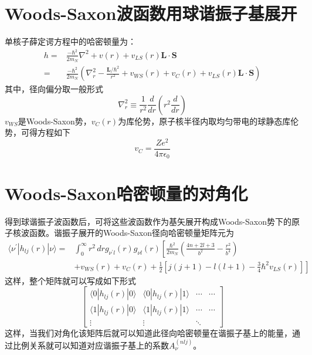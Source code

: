 \section{Woods-Saxon波函数用球谐振子基展开}
单核子薛定谔方程中的哈密顿量为：
\begin{equation}
	\begin{aligned}
		h =& \frac{-\hbar^2}{2 m_{N}} \nabla^2 + v(r) + v_{LS}(r) \boldsymbol{L\cdot S}	\\
		=& \frac{-\hbar^2}{2 m_{N}}\left(\nabla^2_{r} - \frac{\boldsymbol{L}/\hbar^2}{r^2} + v_{WS}(r) + v_{C}(r) + v_{LS}(r)\boldsymbol{L\cdot S}\right)
	\end{aligned}
\end{equation} 
其中，径向偏分取一般形式
\begin{equation}
	\nabla^2_{r} \equiv \frac{1}{r^2} \frac{d}{dr} \left(r^2 \frac{d}{dr}\right)
\end{equation}
$v_{WS}$是Woods-Saxon势，$v_{C}(r)$为库伦势，原子核半径内取均匀带电的球静态库伦势，可得方程如下
\begin{equation}
	v_{C} = \frac{Ze^2}{4\pi\epsilon_0}
\end{equation} 

\section{Woods-Saxon哈密顿量的对角化}
得到球谐振子波函数后，可将这些波函数作为基矢展开构成Woods-Saxon势下的原子核波函数。谐振子展开的Woods-Saxon径向哈密顿量矩阵元为
\begin{equation}
    \begin{aligned}
		\langle \nu^{\prime} | h_{lj}(r) | \nu\rangle =&\int_{0}^{\infty} r^2 \,dr g_{\nu^{\prime} l}(r) g_{\nu l}(r) \left[ \frac{\hbar^2}{2m_N} \left(\frac{4n + 2l + 3}{b^2} - \frac{r^2}{b^4}\right) \right. \\
		&+ \left. v_{WS}(r) + v_{C}(r) + \frac{1}{2}\left[j(j+1) - l(l+1) - \frac{3}{4}\hbar^2 v_{LS}(r)\right] \right]
    \end{aligned}
\end{equation}
这样，整个矩阵就可以写成如下形式
\begin{equation}
	\begin{bmatrix}
		\langle 0 | h_{lj}(r) | 0 \rangle & \langle 0 | h_{lj}(r) | 1 \rangle & \cdots	& \cdots	\\
		\langle 1 | h_{lj}(r) | 0 \rangle & \langle 1 | h_{lj}(r) | 1 \rangle & \cdots	& \cdots	\\
		\vdots	&	\vdots	& \ddots
	\end{bmatrix}
\end{equation}
这样，当我们对角化该矩阵后就可以知道此径向哈密顿量在谐振子基上的能量，通过比例关系就可以知道对应谐振子基上的系数$A_{\nu}^{(nlj)}$。


